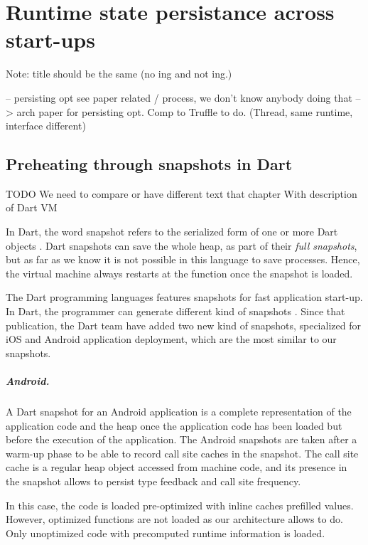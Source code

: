 \documentclass[a4paper,12pt,twoside]{../includes/ThesisStyle}
\begin{document}
\fi

\chapter{Runtime state persistance across start-ups}
\label{chap:persistance}
\minitoc


Note: title should be the same (no ing and not ing.)

-- persisting opt see paper related / process, we don't know anybody doing that
--> arch paper for persisting opt. Comp to Truffle to do. (Thread, same runtime, interface different)

\section{Preheating through snapshots in Dart}

TODO
We need to compare or have different text that chapter With description of Dart VM


In Dart, the word snapshot refers to the serialized form of one or more Dart objects \cite{Anna13a}. Dart snapshots can save the whole heap, as part of their \emph{full snapshots}, but as far as we know it is not possible in this language to save processes. Hence, the virtual machine always restarts at the  function once the snapshot is loaded.


The Dart programming languages features snapshots for fast application start-up. In Dart, the programmer can generate different kind of snapshots \cite{Anna13a}. Since that publication, the Dart team have added two new kind of snapshots, specialized for iOS and Android application deployment, which are the most similar to our snapshots.

\paragraph{Android.} A Dart snapshot for an Android application is a complete representation of the application code and the heap once the application code has been loaded but before the execution of the application. The Android snapshots are taken after a warm-up phase to be able to record call site caches in the snapshot. The call site cache is a regular heap object accessed from machine code, and its presence in the snapshot allows to persist type feedback and call site frequency.

In this case, the code is loaded pre-optimized with inline caches prefilled values. However, optimized functions are not loaded as our architecture allows to do. Only unoptimized code with precomputed runtime information is loaded.
\end{document}
